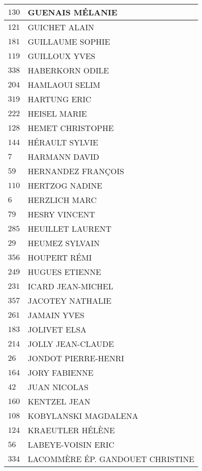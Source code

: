 \begin{xltabular}{\linewidth}{|l|X|}
    \hline
    $130$ & GUENAIS MÉLANIE \\
    \hline
    $121$ & GUICHET ALAIN \\
    \hline
    $181$ & GUILLAUME SOPHIE \\
    \hline
    $119$ & GUILLOUX YVES \\
    \hline
    $338$ & HABERKORN ODILE \\
    \hline
    $204$ & HAMLAOUI SELIM \\
    \hline
    $319$ & HARTUNG ERIC \\
    \hline
    $222$ & HEISEL MARIE \\
    \hline
    $128$ & HEMET CHRISTOPHE \\
    \hline
    $144$ & HÉRAULT SYLVIE \\
    \hline
    $7$ & HARMANN DAVID \\
    \hline
    $59$ & HERNANDEZ FRANÇOIS \\
    \hline
    $110$ & HERTZOG NADINE \\
    \hline
    $6$ & HERZLICH MARC \\
    \hline
    $79$ & HESRY VINCENT \\
    \hline
    $285$ & HEUILLET LAURENT \\
    \hline
    $29$ & HEUMEZ SYLVAIN \\
    \hline
    $356$ & HOUPERT RÉMI \\
    \hline
    $249$ & HUGUES ETIENNE \\
    \hline
    $231$ & ICARD JEAN-MICHEL \\
    \hline
    $357$ & JACOTEY NATHALIE \\
    \hline
    $261$ & JAMAIN YVES \\
    \hline
    $183$ & JOLIVET ELSA \\
    \hline
    $214$ & JOLLY JEAN-CLAUDE \\
    \hline
    $26$ & JONDOT PIERRE-HENRI \\
    \hline
    $164$ & JORY FABIENNE \\
    \hline
    $42$ & JUAN NICOLAS \\
    \hline
    $160$ & KENTZEL JEAN \\
    \hline
    $108$ & KOBYLANSKI MAGDALENA \\
    \hline
    $124$ & KRAEUTLER HÉLÈNE \\
    \hline
    $56$ & LABEYE-VOISIN ERIC \\
    \hline
    $334$ & LACOMMÈRE ÉP. GANDOUET CHRISTINE \\

\end{xltabular}
